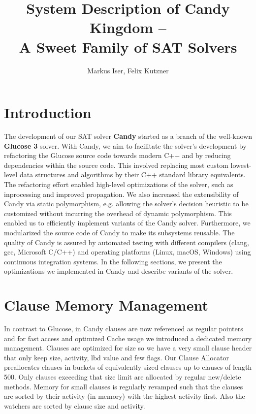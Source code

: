 \documentclass[conference]{IEEEtran}
\title{System Description of Candy Kingdom --\\ A Sweet Family of SAT Solvers}
\author{Markus Iser, Felix Kutzner}
\begin{document}
\maketitle

\begin{abstract}

\end{abstract}

\section{Introduction}

The development of our SAT solver \textbf{Candy} started as a branch of the well-known \textbf{Glucose 3} solver.
With Candy, we aim to facilitate the solver's development by refactoring the Glucose source code towards modern C++ and by reducing dependencies within the source code.
This involved replacing most custom lowest-level data structures and algorithms by their C++ standard library equivalents.
The refactoring effort enabled high-level optimizations of the solver, such as inprocessing and improved propagation.
We also increased the extensibility of Candy via static polymorphism, e.g. allowing the solver's decision heuristic to be customized without incurring the overhead of dynamic polymorphism. This enabled us to efficiently implement variants of the Candy solver.
Furthermore, we modularized the source code of Candy to make its subsystems reusable.
The quality of Candy is assured by automated testing with different compilers (clang, gcc, Microsoft C/C++) and operating platforms (Linux, macOS, Windows) using continuous integration systems.
In the following sections, we present the optimizations we implemented in Candy and describe variants of the solver.

\section{Clause Memory Management}
\label{sec:clauses}

In contrast to Glucose, in Candy clauses are now referenced as regular pointers and for fast access and optimized Cache usage we introduced a dedicated memory management. Clauses are optimized for size so we have a very small clause header that only keep size, activity, lbd value and few flags. Our Clause Allocator preallocates clauses in buckets of equivalently sized clauses up to clauses of length 500. Only clauses exceeding that size limit are allocated by regular new/delete methods. Memory for small clauses is regularly revamped such that the clauses are sorted by their activity (in memory) with the highest activity first. Also the watchers are sorted by clause size and activity. 
\end{document}
